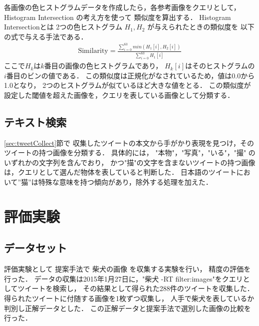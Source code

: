 各画像の色ヒストグラムデータを作成したら，各参考画像をクエリとして，
Histogram Intersection
の考え方を使って
類似度を算出する．
Histogram Intersectionとは
2つの色ヒストグラム
$H_1,H_2$
が与えられたときの類似度を
以下の式で与える手法である．
%
\begin{eqnarray}
\mbox{Similarity} = \frac{\sum_{i=0}^{63} min(H_1[i],H_2[i])}{\sum_{i=0}^{63} H_1[i]}
\end{eqnarray}
%
ここで$H_k$は$k$番目の画像の色ヒストグラムであり，
$H_k[i]$はそのヒストグラムの$i$番目のビンの値である．
この類似度は正規化がなされているため，値は0.0から1.0となり，
2つのヒストグラムが似ているほど大きな値をとる．
この類似度が設定した閾値を超えた画像を，クエリを表している画像として分類する．



\section{テキスト検索}
\label{sec:textSearch}
\ref{sec:tweetCollect}節で
収集したツイートの本文から手がかり表現を見つけ，そのツイートの持つ画像を分類する．
具体的には，
"本物"，"写真"，"いる"，"撮"
のいずれかの文字列を含んでおり，
かつ"描"の文字を含まないツイートの持つ画像は，クエリとして選んだ物体を表していると判断した．
日本語のツイートにおいて''猫''は特殊な意味を持つ傾向があり，除外する処理を加えた．


\chapter{評価実験}
\label{sec:experiment}
\section{データセット}


評価実験として
提案手法で
柴犬の画像
を収集する実験を行い，
精度の評価を行った．
データの収集は2015年1月27日に，"柴犬 -RT filter:images"をクエリとしてツイートを検索し，
その結果として得られた288件のツイートを収集した．
得られたツイートに付随する画像を1枚ずつ収集し，
人手で柴犬を表しているか判別し正解データとした．
この正解データと提案手法で選別した画像の比較を行った．

